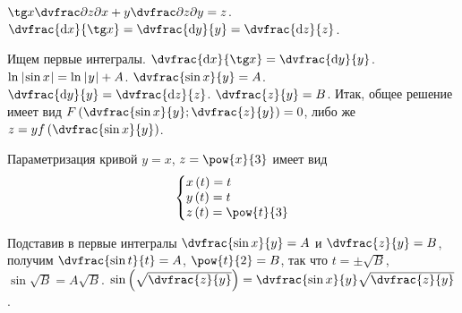 \documentclass[a5paper,10pt]{article}
\begin{document}
    $\tg x \vparder{z}{x} + y \vparder{z}{y} = z$.
    $\dvfrac {\di x} {\tg x}
    = \dvfrac {\di y} {y}
    = \dvfrac {\di z} {z}$.

    Ищем первые интегралы.
    $\dvfrac {\di x} {\tg x} = \dvfrac {\di y} {y}$.
    $\ln\hspace{0.2mm}\left|\hspace{0.06em}\sin x\hspace{0.06em}\right| = \ln\hspace{0.2mm}\left|\hspace{0.06em}y\hspace{0.06em}\right| + A$.
    $\dvfrac {\sin x} {y} = A$.
    $\dvfrac {\di y} {y} = \dvfrac{\di z} {z}$.
    $\dvfrac {z}{y} = B$.
    Итак, общее решение имеет вид
    $F\br{\dvfrac {\sin x} {y}; \dvfrac {z} {y}} = 0$,
    либо же $z = yf\br{\dvfrac {\sin x} {y}}$.

    Параметризация кривой $y = x$, $z = \pow{x}{3}$ имеет вид
    $$\tsys{x\br{t} = t \\ y\br{t} = t \\ z\br{t} = \pow{t}{3}}$$

    Подставив в первые интегралы
    $\dvfrac {\sin x} {y} = A$ и $\dvfrac {z}{y} = B$,
    получим $\dvfrac {\sin t} {t} = A$, $\pow{t}{2} = B$, так что
    $t = \pm \sqrt{B}$,
    $\sin \sqrt{B} = A \sqrt{B}$.
    $\sin \br{\sqrt{\dvfrac {z} {y}}} = \dvfrac {\sin x} {y} \sqrt{\dvfrac {z} {y}}$.
\end{document}
